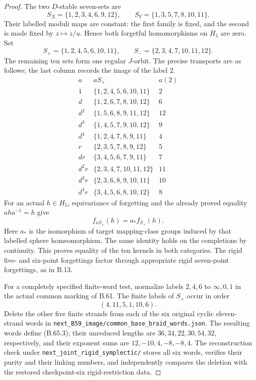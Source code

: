 \begin{proof}
The two $D$-stable seven-sets are
\[
 S_X=\{1,2,3,4,6,9,12\},\qquad
 S_Y=\{1,3,5,7,8,10,11\}.
\]
Their labelled moduli maps are constant: the first family
is fixed, and the second is made fixed by $z\mapsto z/u$.
Hence both forgetful homomorphisms on $H_5$ are zero.
Set
\[
 S_+=\{1,2,4,5,6,10,11\},\qquad
 S_-=\{2,3,4,7,10,11,12\}.
\]
The remaining ten sets form one regular $J$-orbit.
The precise transports are as follows; the last column
records the image of the label $2$.
\[
\begin{array}{c|c|c}
 a&aS_+&a(2)\\\hline
 1&\{1,2,4,5,6,10,11\}&2\\
 d&\{1,2,6,7,8,10,12\}&6\\
 d^2&\{1,5,6,8,9,11,12\}&12\\
 d^3&\{1,4,5,7,9,10,12\}&9\\
 d^4&\{1,2,4,7,8,9,11\}&4\\
 r&\{2,3,5,7,8,9,12\}&5\\
 dr&\{3,4,5,6,7,9,11\}&7\\
 d^2r&\{2,3,4,7,10,11,12\}&11\\
 d^3r&\{2,3,6,8,9,10,11\}&10\\
 d^4r&\{3,4,5,6,8,10,12\}&8
\end{array}
                                                               \tag{B.65.7}
\]
For an actual $h\in H_5$, equivariance of forgetting and
the already proved equality $aha^{-1}=h$ give
\[
          f_{aS_+}(h)=a_*f_{S_+}(h).
                                                               \tag{B.65.8}
\]
Here $a_*$ is the isomorphism of target mapping-class
groups induced by that labelled sphere homeomorphism.
The same identity holds on the completions by continuity.
This proves equality of the ten kernels in both categories.
The rigid five- and six-point forgettings factor through
appropriate rigid seven-point forgettings, as in B.13.

For a completely specified finite-word test, normalize
labels $2,4,6$ to $\infty,0,1$ in the actual common
marking of B.61.  The finite labels of $S_+$ occur in order
\[
                       (4,11,5,1,10,6).
                                                               \tag{B.65.9}
\]
Delete the other five finite strands from each of the six
original cyclic eleven-strand words in
\nolinkurl{next_B59_image/common_base_braid_words.json}.
The resulting words define (B.65.3); their unreduced lengths
are $36,34,22,30,54,32$, respectively, and their exponent
sums are $12,-10,4,-8,-8,4$.
The reconstruction check under
\nolinkurl{next_joint_rigid_symplectic/}
stores all six words, verifies their purity and their
linking numbers, and independently compares the deletion
with the restored checkpoint-six rigid-restriction data.


\end{proof}
